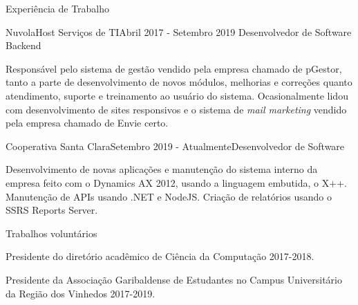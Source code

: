 \documentclass{resume} %
\begin{document}
\begin{rSection}{Experi\^encia de Trabalho}

\begin{rSubsection}{NuvolaHost Servi\c{c}os de TI}{Abril 2017 - Setembro 2019 }{Desenvolvedor de Software Backend}{}
\item Respons\'avel pelo sistema de gest\~ao vendido pela empresa chamado de pGestor, tanto a parte de desenvolvimento de novos m\'odulos, melhorias e corre\c{c}\~oes quanto  atendimento, suporte e treinamento ao usu\'ario do sistema. Ocasionalmente lidou com desenvolvimento de sites responsivos e o sistema de \textit{mail marketing} vendido pela empresa chamado de Envie certo.
\end{rSubsection}

\begin{rSubsection}{Cooperativa Santa Clara}{Setembro 2019 - Atualmente}{Desenvolvedor de Software}{}
\item Desenvolvimento de novas aplicações e manutenção do sistema interno da empresa feito com o Dynamics AX 2012, usando a linguagem embutida, o X++. Manutenção de APIs usando .NET e NodeJS. Criação de relatórios usando o SSRS Reports Server.
\end{rSubsection}

\end{rSection}



\begin{rSection}{Trabalhos volunt\'arios} 
\item Presidente do diret\'orio acad\^emico de Ci\^encia da Computa\c{c}\~ao 2017-2018.
\item Presidente da Associa\c{c}\~ao Garibaldense de Estudantes no Campus Universit\'ario da Regi\~ao dos Vinhedos 2017-2019.
\end{rSection}
\end{document}
